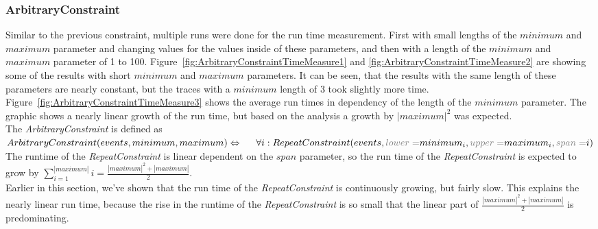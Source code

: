 \subsubsection{ArbitraryConstraint}
	Similar to the previous constraint, multiple runs were done for the run time measurement. First with small lengths of the $minimum$ and $maximum$ parameter and changing values for the values inside of these parameters, and then with a length of the $minimum$ and $maximum$ parameter of 1 to 100. Figure~\ref{fig:ArbitraryConstraintTimeMeasure1} and \ref{fig:ArbitraryConstraintTimeMeasure2} are showing some of the results with short $minimum$ and $maximum$ parameters. It can be seen, that the results with the same length of these parameters are nearly constant, but the traces with a $minimum$ length of 3 took slightly more time. Figure~\ref{fig:ArbitraryConstraintTimeMeasure3} shows the average run times in dependency of the length of the $minimum$ parameter. The graphic shows a nearly linear growth of the run time, but based on the analysis a growth by $|maximum|^2$ was expected.\\
	The \textit{ArbitraryConstraint} is defined as\\[10pt]
	\begin{math}
		ArbitraryConstraint(events, minimum, maximum)\Leftrightarrow\\
		\hspace{0.5cm} \forall i: RepeatConstraint(events, \textcolor{gray}{lower=}minimum_i, \textcolor{gray}{upper=}maximum_i, \textcolor{gray}{span=}i)
	\end{math}\\[10pt]
	The runtime of the \textit{RepeatConstraint} is linear dependent on the $span$ parameter, so the run time of the \textit{RepeatConstraint} is expected to grow by $\sum_{i=1}^{|maximum|}i=\frac{|maximum|^2+|maximum|}{2}$.\\
	Earlier in this section, we've shown that the run time of the \textit{RepeatConstraint} is continuously growing, but fairly slow. This explains the nearly linear run time, because the rise in the runtime of the \textit{RepeatConstraint} is so small that the linear part of $\frac{|maximum|^2+|maximum|}{2}$ is predominating.
